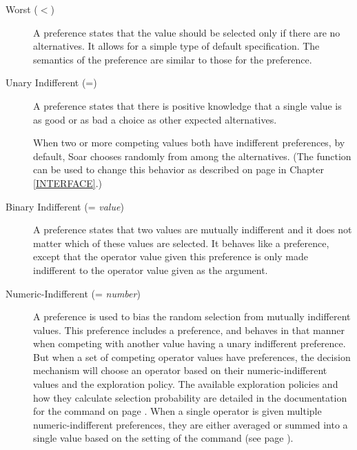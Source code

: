 \begin{description}
\item [Worst ($<$)] 
	A  preference states that the value should be selected only if there are no alternatives.  It allows for a simple type of default specification. The semantics of the  preference are similar to those for the  preference.
\vspace{-8pt}

\item [Unary Indifferent (=)] 
	A  preference states that there is positive knowledge that a single value is as good or as bad a choice as other expected alternatives. 
	
	When two or more competing values both have indifferent preferences, by default, Soar chooses randomly from among the alternatives. (The  function can be used to change this behavior as described on page \pageref{decide-indifferent-selection} in Chapter \ref{INTERFACE}.)
\vspace{-8pt}

\item [Binary Indifferent (= \emph{value})] 
	A  preference states that two values are mutually indifferent and it does not matter which of these values are selected. It behaves like a  preference, except that the operator value given this preference is only made indifferent to the operator value given as the argument.
\vspace{-8pt}

\item [Numeric-Indifferent (= \emph{number})]
	A  preference is used to bias the random selection from mutually indifferent values. This preference includes a  preference, and behaves in that manner when competing with another value having a unary indifferent preference. 
	But when a set of competing operator values have  preferences, the decision mechanism will choose an operator based on their numeric-indifferent values and the exploration policy. The available exploration policies and how they calculate selection probability are detailed in the documentation for the  command on page \pageref{decide-indifferent-selection}. When a single operator is given multiple numeric-indifferent preferences, they are either averaged or summed into a single value based on the setting of the  command (see page \pageref{decide-numeric-indifferent-mode}).


\end{description}
